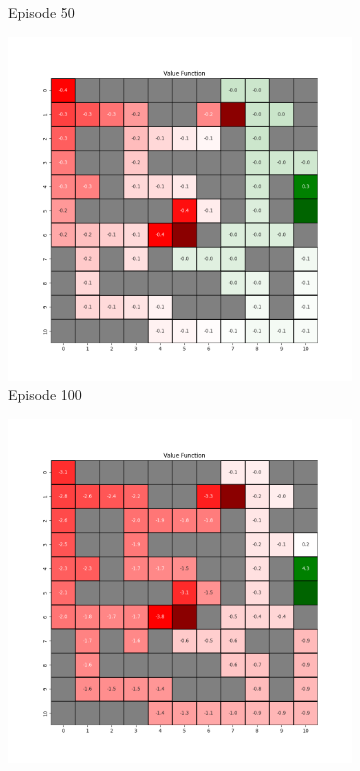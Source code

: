\documentclass{assignment}
\begin{document}
\begin{figure}[H]
\begin{subfigure}{0.3\textwidth}
    \caption{Episode 50}
    \end{subfigure}\hfill
    \begin{subfigure}{0.3\textwidth}
        \includegraphics[width=\textwidth]{figures/value_q/alpha_sweep/value_function_alpha_0.001_gamma_0.95_epsilon_0.2_iteration_100.png}
    \caption{Episode 100}
    \end{subfigure}
    \begin{subfigure}{0.3\textwidth}
        \includegraphics[width=\textwidth]{figures/value_q/alpha_sweep/value_function_alpha_0.001_gamma_0.95_epsilon_0.2_iteration_1000.png}

\end{subfigure}
\end{figure}
\end{document}

